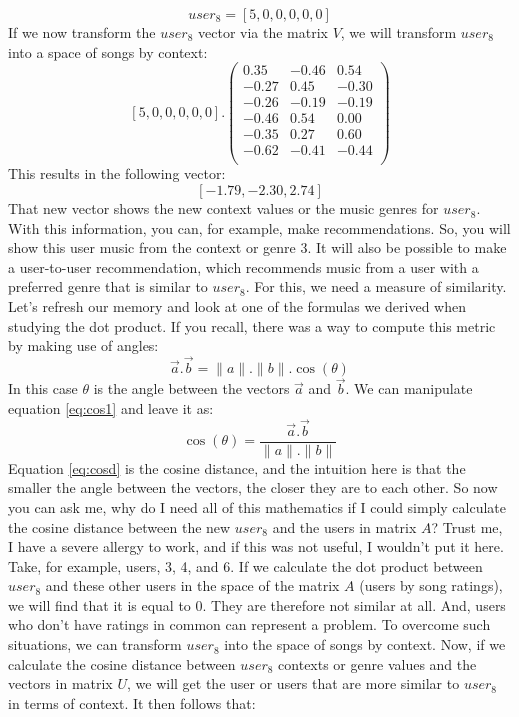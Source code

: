 \documentclass[600paper, 11pt,twoside,openany]{kdp}
\begin{document}
\[user_8 = \left[5,0,0,0,0,0 \right] \]
\indent If we now transform the $user_8$  vector via the matrix $V$, we will transform $user_8$ into a space of songs by context:
\[
\left[5,0,0,0,0,0 \right] . \begin{pmatrix}
	0.35	& -0.46	 & 0.54 \\
	-0.27	& 0.45	& -0.30 \\
	-0.26	& -0.19	& -0.19 \\
	-0.46	&0.54	&0.00 \\ 
	-0.35	&0.27	&0.60\\
	-0.62	&-0.41	&-0.44\\
\end{pmatrix}
\]
\indent This results in the following vector:
\[\left[-1.79, -2.30,  2.74 \right]\]
\indent That new vector shows the new context values or the music genres for $user_8$. With this information, you can, for example, make recommendations. So, you will show this user music from the context or genre 3. It will also be possible to make a user-to-user recommendation, which recommends music from a user with a preferred genre that is similar to $user_8$. For this, we need a measure of similarity. Let’s refresh our memory and look at one of the formulas we derived when studying the dot product. If you recall, there was a way to compute this metric by making use of angles:
\begin{equation}
\overrightarrow{a}.\overrightarrow{b} = \lVert a \rVert .\lVert b \rVert.\cos(\theta) \label{eq:cos1}
\end{equation}
\indent In this case $\theta$ is the angle between the vectors $\overrightarrow{a}$ and $\overrightarrow{b}$. We can manipulate equation \ref{eq:cos1} and leave it as:
\begin{equation}\label{eq:cosd}
\cos(\theta) = \frac{\overrightarrow{a}.\overrightarrow{b}}{ \lVert a \rVert .\lVert b \rVert}
\end{equation}
\indent Equation \ref{eq:cosd} is the cosine distance, and the intuition here is that the smaller the angle between the vectors, the closer they are to each other. So now you can ask me, why do I need all of this mathematics if I could simply calculate the cosine distance between the new $user_8$ and the users in matrix $A$? Trust me, I have a severe allergy to work, and if this was not useful, I wouldn't put it here. Take, for example, users, 3, 4, and 6. If we calculate the dot product between $user_8$ and these other users in the space of the matrix $A$ (users by song ratings), we will find that it is equal to 0. They are therefore not similar at all. And, users who don’t have ratings in common can represent a problem. To overcome such situations, we can transform $user_8$ into the space of songs by context. Now, if we calculate the cosine distance between $user_8$ contexts or genre values and the vectors in matrix $U$, we will get the user or users that are more similar to  $user_8$ in terms of context. It then follows that:
\end{document}
